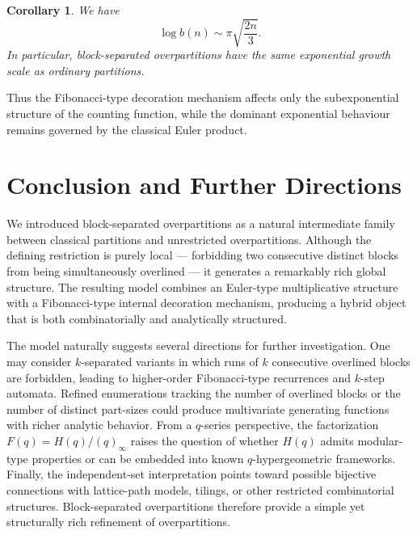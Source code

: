 \documentclass[letterpaper,12pt]{article}
\newtheorem{corollary}{Corollary}
\begin{document}
 

\begin{corollary}
We have
\[
\log b(n)\sim
\pi\sqrt{\frac{2n}{3}}.
\]
In particular, block-separated overpartitions have the same exponential
growth scale as ordinary partitions.
\end{corollary}

 

Thus the Fibonacci-type decoration mechanism affects only the
subexponential structure of the counting function, while the
dominant exponential behaviour remains governed by the classical
Euler product.

\section{Conclusion and Further Directions}\label{sec:conclusion}


 

We introduced block-separated overpartitions as a natural intermediate family between classical partitions and unrestricted overpartitions. 
Although the defining restriction is purely local — forbidding two consecutive distinct blocks from being simultaneously overlined — it generates a remarkably rich global structure. 
The resulting model combines an Euler-type multiplicative structure with a Fibonacci-type internal decoration mechanism, producing a hybrid object that is both combinatorially   and analytically structured.

 

The model naturally suggests several directions for further investigation. 
One may consider $k$-separated variants in which runs of $k$ consecutive overlined blocks are forbidden, leading to higher-order Fibonacci-type recurrences and $k$-step automata. 
Refined enumerations tracking the number of overlined blocks or the number of distinct part-sizes could produce multivariate generating functions with richer analytic behavior. 
From a $q$-series perspective, the factorization $F(q)=H(q)/(q)_\infty$ raises the question of whether $H(q)$ admits modular-type properties or can be embedded into known $q$-hypergeometric frameworks. 
Finally, the independent-set interpretation points toward possible bijective connections with lattice-path models, tilings, or other restricted combinatorial structures. Block-separated overpartitions therefore provide a simple yet structurally rich refinement of overpartitions.
 

\end{document}
